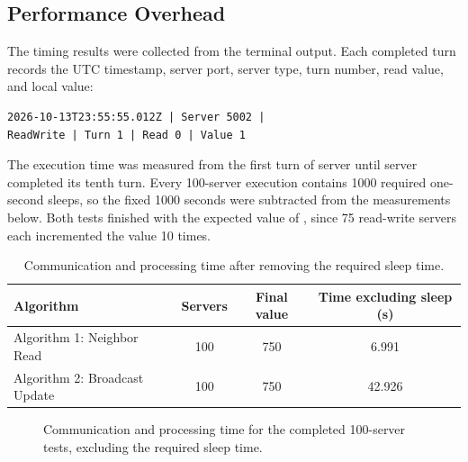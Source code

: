 \documentclass[12pt,a4paper,english]{article}
\newcommand{\cod}[1]{{\fontfamily{qcr}\selectfont{\small#1}}}
\begin{document}
\subsection{Performance Overhead}

The timing results were collected from the terminal output. Each completed turn records the UTC timestamp, server port, server type, turn number, read value, and local value:

\begin{verbatim}
2026-10-13T23:55:55.012Z | Server 5002 |
ReadWrite | Turn 1 | Read 0 | Value 1
\end{verbatim}

The execution time was measured from the first turn of server \cod{5002} until server \cod{5001} completed its tenth turn. Every 100-server execution contains 1000 required one-second sleeps, so the fixed 1000 seconds were subtracted from the measurements below. Both tests finished with the expected value of \cod{750}, since 75 read-write servers each incremented the value 10 times.

\begin{table}[H]
\centering
\begin{tabular}{|l|c|c|c|}
\hline
Algorithm & Servers & Final value & Time excluding sleep (s) \\
\hline
Algorithm 1: Neighbor Read & 100 & 750 & 6.991 \\
\hline
Algorithm 2: Broadcast Update & 100 & 750 & 42.926 \\
\hline
\end{tabular}
\caption{Communication and processing time after removing the required sleep time.}
\label{tab:performance-results}
\end{table}

\begin{figure}[H]
\centering
{}
\caption{Communication and processing time for the completed 100-server tests, excluding the required sleep time.}
\label{fig:performance-comparison}
\end{figure}
\end{document}
